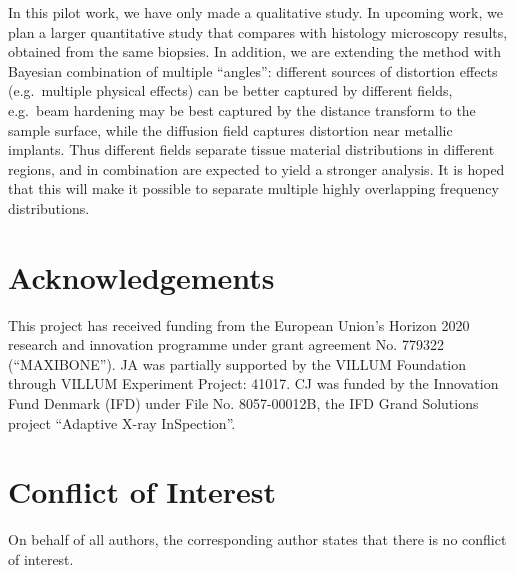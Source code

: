 \documentclass[pdflatex,sn-mathphys]{sn-jnl}%
\theoremstyle{thmstyleone}%
\theoremstyle{thmstyletwo}%
\theoremstyle{thmstylethree}%
\begin{document}
In this pilot work, we have only made a qualitative study. In upcoming
work, we plan a larger quantitative study that compares with histology
microscopy results, obtained from the same biopsies.  In addition, we
are extending the method with Bayesian combination of multiple
``angles'': different sources of distortion effects (e.g.~multiple
physical effects) can be better captured by different fields,
e.g.~beam hardening may be best captured by the distance transform to
the sample surface, while the diffusion field captures distortion near
metallic implants. Thus different fields separate tissue material
distributions in different regions, and in combination are expected to
yield a stronger analysis. It is hoped that this will make it possible
to separate multiple highly overlapping frequency distributions.


\section{Acknowledgements}

This project has received funding from the European Union’s Horizon 2020 research and innovation programme under grant agreement No. 779322 (``MAXIBONE'').
JA was partially supported by the VILLUM Foundation through VILLUM Experiment Project: 41017.
CJ was funded by the Innovation Fund Denmark (IFD) under File No. 8057-00012B, the IFD Grand Solutions project ``Adaptive X-ray InSpection''.

\section{Conflict of Interest}
On behalf of all authors, the corresponding author states that there is no conflict of interest. 


\end{document}
